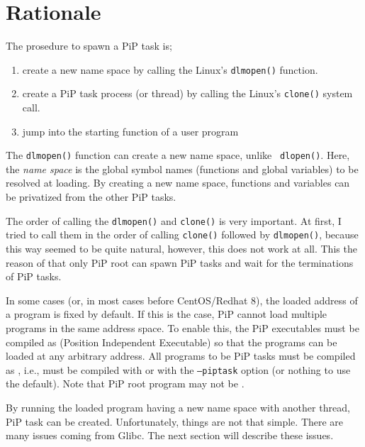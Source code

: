 
\section{Rationale}\label{sec:rationale}

The prosedure to spawn a PiP task is;

\begin{enumerate}
\item create a new name space by calling the Linux's {\tt dlmopen()}
  function.
\item create a PiP task process (or thread) by calling the Linux's
  {\tt clone()} system call.
\item jump into the starting function of a user program
\end{enumerate}

The {\tt dlmopen()} function can create a new name space, unlike {\tt
  dlopen()}. Here, the {\it name space} is the global symbol names
(functions and global variables) to be resolved at loading. By
creating a new name space, functions and variables can be
privatized from the other PiP tasks. 

The order of calling the {\tt dlmopen()} and {\tt clone()} is very
important.  At first, I tried to call them in the order of calling
{\tt clone()} followed by {\tt dlmopen()}, because this way seemed to be
quite natural, however, this does not work at all. This the reason of
that only PiP root can spawn PiP tasks and wait for the terminations
of PiP tasks. 

In some cases (or, in most cases before CentOS/Redhat 8), the loaded
address of a program is fixed by default. If this is the case, PiP
cannot load multiple programs in the same address space. To enable
this, the PiP executables must be compiled as \PIE (Position
Independent Executable) so that the programs can be loaded at any
arbitrary address. All programs to be PiP tasks must be compiled as
\PIE, i.e., must be compiled with  or 
with the {\tt --piptask} option (or nothing to use the default). Note
that PiP root program may not be \PIE.  

By running the loaded program having a new name space with another
thread, PiP task can be created. Unfortunately, things are not that
simple. There are many issues coming from Glibc. The next section will
describe these issues. 
